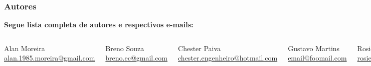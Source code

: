 
\begin{frame}
  \frametitle{Autores}

  \begin{alertblock}{}
    \vspace{5mm}

    \normalsize{\alert{\textbf{Segue lista completa de autores e respectivos e-mails:}}}
    \vspace{5mm}

    \begin{columns}
      \centering
      \normalsize{Alan Moreira}
      \scriptsize{\href{mailto:alan.1985.moreira@gmail.com}{alan.1985.moreira@gmail.com}}
      \vspace{5mm}

      \normalsize{Breno Souza}
      \scriptsize{\href{mailto:breno.ec@gmail.com}{breno.ec@gmail.com}}
      \vspace{5mm}

      \normalsize{Chester Paiva}
      \scriptsize{\href{mailto:chester.engenheiro@hotmail.com}{chester.engenheiro@hotmail.com}}
      \vspace{5mm}

      \centering
      \normalsize{Gustavo Martins}
      \scriptsize{\href{mailto:email@foomail.com}{email@foomail.com}}
      \vspace{5mm}

      \normalsize{Rosiene Corrêa}
      \scriptsize{\href{mailto:rosienecorrea@yahoo.com.br}{rosienecorrea@yahoo.com.br}}
      \vspace{5mm}

      \normalsize{Vinícius Marinho}
      \scriptsize{\href{mailto:vinicius_marinho@ymail.com}{vinicius\_marinho@ymail.com}}
      \vspace{5mm}
    \end{columns}
  \end{alertblock}

\end{frame}
